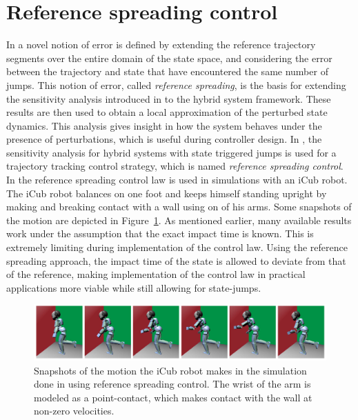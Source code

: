 \documentclass[../DC2017114Bouma.tex]{subfiles}
\begin{document}
\section{Reference spreading control}
In \cite{Saccon2014} a novel notion of error is defined by extending the reference trajectory segments over the entire domain of the state space, and considering the error between the trajectory and state that have encountered the same number of jumps. This notion of error, called \textit{reference spreading}, is the basis for extending the sensitivity analysis introduced in \cite{Khalil1996} to the hybrid system framework. These results are then used to obtain a local approximation of the perturbed state dynamics. This analysis gives insight in how the system behaves under the presence of perturbations, which is useful during controller design. In \cite{Rijnen2016,Rijnen2017}, the sensitivity analysis for hybrid systems with state triggered jumps is used for a trajectory tracking control strategy, which is named \textit{reference spreading control}. In \cite{Rijnen2017a} the reference spreading control law is used in simulations with an iCub robot. The iCub robot balances on one foot and keeps himself standing upright by making and breaking contact with a wall using on of his arms. Some snapshots of the motion are depicted in Figure~\ref{fig:rijnen2017}. As mentioned earlier, many available results work under the assumption that the exact impact time is known. This is extremely limiting during implementation of the control law. Using the reference spreading approach, the impact time of the state is allowed to deviate from that of the reference, making implementation of the control law in practical applications more viable while still allowing for state-jumps.

\begin{figure}[H]
\centering
\includegraphics[width=\textwidth]{rijnen2017.PNG}\caption{Snapshots of the motion the iCub robot makes in the simulation done in \cite{Rijnen2017a} using reference spreading control. The wrist of the arm is modeled as a point-contact, which makes contact with the wall at non-zero velocities.}\label{fig:rijnen2017}
\end{figure}
\end{document}
